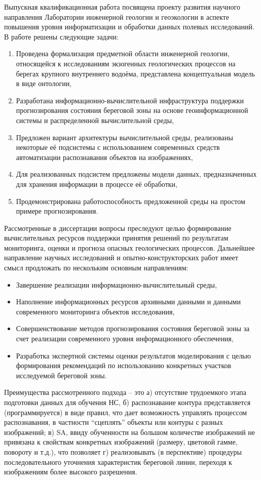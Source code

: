 \documentclass[732,14pt,final]{studrep}
\begin{document}
Выпускная квалификационная работа посвящена проекту развития научного направления Лаборатории инженерной геологии и геоэкологии в аспекте повышения уровня информатизации и обработки данных полевых исследований. В работе решены следующие задачи:
\begin{enumerate}
  \item Проведена формализация предметной области инженерной геологии, относящейся к исследованиям экзогенных геологических процессов на берегах крупного внутреннего водоёма, представлена концептуальная модель в виде онтологии,
  \item Разработана информационно-вычислительной инфраструктура поддержки прогнозирования состояния береговой зоны на основе геоинформационной системы и распределенной вычислительной среды,
  \item Предложен вариант архитектуры вычислительной среды,  реализованы некоторые её подсистемы с использованием современных средств автоматизации распознавания объектов на изображениях,
  \item Для реализованных подсистем предложены модели данных, предназначенных для хранения информации в процессе её обработки,
  \item Продемонстрирована работоспособность предложенной среды на простом примере прогнозирования.
\end{enumerate}

Рассмотренные в диссертации вопросы преследуют целью формирование вычислительных ресурсов поддержки принятия решений по результатам мониторинга, оценки и прогноза опасных геологических процессов. Дальнейшее направление научных исследований и опытно-конструкторских работ имеет смысл продложать по нескольким основным направлениям:
\begin{itemize}
  \item Завершение реализации информационно-вычислительный среды,
  \item Наполнение информационных ресурсов архивными данными и данными современного мониторинга объектов исследования,
  \item Совершенствование методов прогнозирования состояния береговой зоны за счет реализации современного уровня информационного обеспечения,
  \item Разработка экспертной системы оценки результатов моделирования с целью формирования рекомендаций по использованию конкретных участков исследуемой береговой зоны.
\end{itemize}

Преимущества рассмотренного подхода -- это а) отсутствие трудоемкого этапа подготовки данных для обучения НС, б) распознавание контура представляется (программируется) в виде правил, что дает возможность управлять процессом распознавания, в частности “сцеплять” объекты или контуры с разных изображений; в) SA, ввиду обученности на большом количестве изображений не привязана к свойствам конкретных изображений (размеру, цветовой гамме, повороту и т.д.), что позволяет г) реализовывать (в перспективе) процедуры последовательного уточнения характеристик береговой линии, переходя к изображениям более высокого разрешения.
\end{document}
